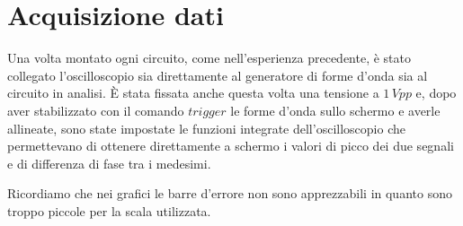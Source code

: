 \section{Acquisizione dati}
Una volta montato ogni circuito, come nell'esperienza precedente, è stato collegato l'oscilloscopio sia direttamente al generatore di forme d'onda sia al circuito in analisi. 
\`E stata fissata anche questa volta una tensione a $1\,Vpp$ e, dopo aver stabilizzato con il comando $trigger$ le forme d'onda sullo schermo e averle allineate, sono state impostate le funzioni integrate dell'oscilloscopio che permettevano di ottenere direttamente a schermo i valori di picco dei due segnali e di differenza di fase tra i medesimi.

\noindent Ricordiamo che nei grafici le barre d'errore non sono apprezzabili in quanto sono troppo piccole per la scala utilizzata.